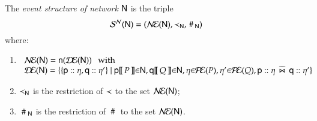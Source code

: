 \begin{definition}  The {\em  event
     structure of network} ${\sf N} $
   is the triple
\[
   \mathcal{S}^{\mathcal{N}}({\sf N}) = (\mathcal{N\!E}({\sf N}), \prec_{{\sf N}} , \,\#\,_{{\sf N}})
\]
where:
\begin{enumerate}
\item{} 
$\begin{array}[t]{ll}\GE(\Nt) =\nr{\DE(\Nt)} ~~\text{ with }\\
\DE(\Nt) = \set{\set{\locev{\pp}{\procev},\locev{\q}{\procev'}} \sep\pP{\pp}{\PP}{\in}\Nt,\pP{\q}{\Q}{\in}\Nt,
\procev{\in}\ES(\PP),  \procev' {\in}\ES(\Q),
  \dualevS{\locev{\pp}{\procev}}{\locev{\q}{\procev'}}}
\end{array}$ 
\smallskip
\item {} 
$\prec _{{\sf N}}$ is the restriction of
  $\prec$ to the set  $\mathcal{N\!E}({\sf N})$;
\item {} 
$~\#~ _{{\sf N}}$ is the restriction of
  $~\#~$ to the set  $\mathcal{N\!E}({\sf N})$.  \end{enumerate}
  \end{definition}



